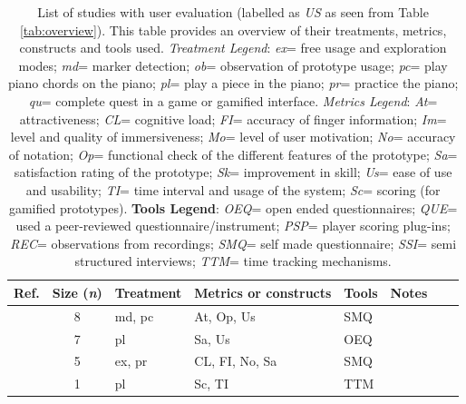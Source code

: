 \documentclass[sigconf, screen, review]{acmart}
\begin{document}
\begin{table}[t]
\caption{List of studies with user evaluation (labelled as \textit{US} as seen from Table \ref{tab:overview}). This table provides an overview of their treatments, metrics, constructs and tools used. \textit{Treatment Legend}: \textit{ex}= free usage and exploration modes; \textit{md}= marker detection; \textit{ob}= observation of prototype usage; \textit{pc}= play piano chords on the piano;  \textit{pl}= play a piece in the piano; \textit{pr}= practice the piano; \textit{qu}= complete quest in a game or gamified interface.  \textit{Metrics Legend}:   \textit{At}= attractiveness; \textit{CL}= cognitive load; \textit{FI}= accuracy of finger information; \textit{Im}= level and quality of immersiveness; \textit{Mo}= level of user motivation; \textit{No}= accuracy of notation; \textit{Op}= functional check of the different features of the prototype; \textit{Sa}= satisfaction rating of the prototype; \textit{Sk}= improvement in skill; \textit{Us}= ease of use and usability; \textit{TI}= time interval and usage of the system; \textit{Sc}= scoring (for gamified prototypes). \textbf{Tools Legend}: \textit{OEQ}= open ended questionnaires; \textit{QUE}= used a peer-reviewed questionnaire/instrument; \textit{PSP}= player scoring plug-ins; \textit{REC}= observations from recordings; \textit{SMQ}= self made questionnaire; \textit{SSI}= semi structured interviews; \textit{TTM}= time tracking mechanisms. }
\label{tab: us-all}
\small\begin{tabularx}{\textwidth}{lclllllX} \toprule
\textbf{Ref.}                           & \textbf{Size} (\textit{n})    & \textbf{Treatment}    & \textbf{Metrics or constructs}    & \textbf{Tools} & \textbf{Notes }\\ \midrule
\cite{nugraha2014pemanfaatan}        & 8            & md, pc      & At, Op, Us             & SMQ                   & \\ \hline
\cite{chow2013music}                 & 7            & pl          & Sa, Us                 & OEQ                   & \\ \hline
\cite{weing2013piano}                & 5            & ex, pr      & CL, FI, No, Sa         & SMQ                   & \\ \hline
\cite{kerdvibulvech2017innovative}   & 1            & pl          & Sc, TI                 & TTM                   & \\ \hline

\end{tabularx}
\end{table}
\end{document}

